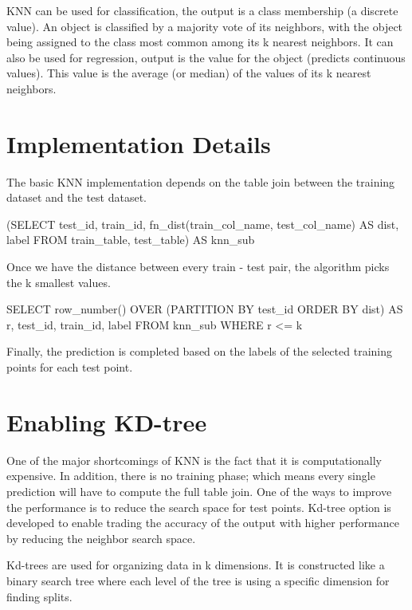KNN can be used for classification, the output is a class membership (a
discrete value). An object is classified by a majority vote of its neighbors,
with the object being assigned to the class most common among its k nearest
neighbors. It can also be used for regression, output is the value for the
object (predicts continuous values). This value is the average (or median) of
the values of its k nearest neighbors.

\section{Implementation Details}

The basic KNN implementation depends on the table join between the training dataset and the test dataset.

\begin{sql}
	(SELECT test_id,
            train_id,
            fn_dist(train_col_name, test_col_name) AS dist,
            label
    FROM train_table, test_table) AS knn_sub
\end{sql}

Once we have the distance between every train - test pair, the algorithm picks the k smallest values.

\begin{sql}
	SELECT row_number() OVER
        (PARTITION BY test_id ORDER BY dist) AS r,
        test_id,
        train_id,
        label
	FROM knn_sub
	WHERE r <= k
\end{sql}

Finally, the prediction is completed based on the labels of the selected
training points for each test point.

\section{Enabling KD-tree}

One of the major shortcomings of KNN is the fact that it is computationally
expensive. In addition, there is no training phase; which means every single
prediction will have to compute the full table join. One of the ways to
improve the performance is to reduce the search space for test points. Kd-tree
option is developed to enable trading the accuracy of the output with higher
performance by reducing the neighbor search space.

Kd-trees are used for organizing data in k dimensions. It is constructed like
a binary search tree where each level of the tree is using a specific
dimension for finding splits.


